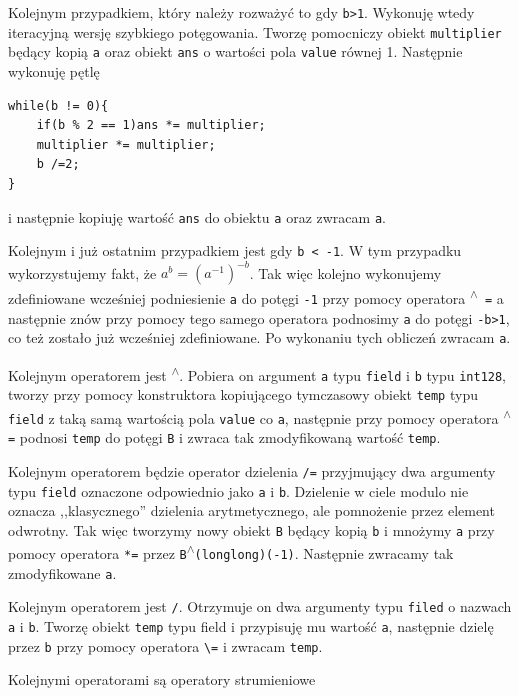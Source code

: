 \documentclass{article}
\begin{document}
Kolejnym przypadkiem, który należy rozważyć to gdy \texttt{b>1}. Wykonuję wtedy iteracyjną wersję szybkiego potęgowania.
Tworzę pomocniczy obiekt \texttt{multiplier} będący kopią \texttt{a} oraz obiekt \texttt{ans} o
wartości pola \texttt{value} równej 1. Następnie wykonuję pętlę
\begin{verbatim}
while(b != 0){
    if(b % 2 == 1)ans *= multiplier;
    multiplier *= multiplier;
    b /=2;
}
\end{verbatim}
i następnie kopiuję wartość \texttt{ans} do obiektu \texttt{a} oraz zwracam \texttt{a}.

Kolejnym i już ostatnim przypadkiem jest gdy \texttt{b < -1}. W tym przypadku wykorzystujemy 
fakt, że $a^b=(a^{-1})^{-b}$. Tak więc kolejno wykonujemy zdefiniowane wcześniej 
podniesienie \texttt{a} do potęgi \texttt{-1} przy pomocy operatora \texttt{\textsuperscript{$\wedge$} =} 
a następnie znów przy
pomocy tego samego operatora podnosimy \texttt{a} do potęgi \texttt{-b>1}, co też zostało już 
wcześniej zdefiniowane. Po wykonaniu tych obliczeń zwracam \texttt{a}.

Kolejnym operatorem jest \texttt{\textsuperscript{$\wedge$}}. Pobiera on argument \texttt{a} typu 
\texttt{field} i \texttt{b} typu 
\texttt{\textunderscore \textunderscore int128}, tworzy
przy pomocy konstruktora kopiującego tymczasowy obiekt \texttt{temp} typu \texttt{field} z taką 
samą wartością pola 
\texttt{value} co \texttt{a}, następnie przy pomocy operatora 
\texttt{\textsuperscript{$\wedge$}=} podnosi 
\texttt{temp} do potęgi \texttt{B} i zwraca tak zmodyfikowaną wartość \texttt{temp}.

Kolejnym operatorem będzie operator dzielenia \texttt{/=} przyjmujący dwa argumenty typu 
\texttt{field} oznaczone odpowiednio jako \texttt{a} i \texttt{b}. Dzielenie w ciele modulo nie oznacza
,,klasycznego'' dzielenia arytmetycznego, ale pomnożenie przez element odwrotny. 
Tak więc tworzymy nowy obiekt \texttt{B} będący kopią \texttt{b} i mnożymy \texttt{a} przy pomocy
operatora \texttt{*=} przez \texttt{B\textsuperscript{$\wedge$}(long$ $long)(-1)}. Następnie zwracamy tak zmodyfikowane \texttt{a}.

Kolejnym operatorem jest \texttt{/}. Otrzymuje on dwa argumenty typu \texttt{filed} o nazwach \texttt{a} i 
\texttt{b}. Tworzę obiekt \texttt{temp} typu field i przypisuję mu wartość \texttt{a}, następnie dzielę przez \texttt{b} przy pomocy 
operatora \texttt{\textbackslash=} i zwracam \texttt{temp}.

Kolejnymi operatorami są operatory strumieniowe
\end{document}
